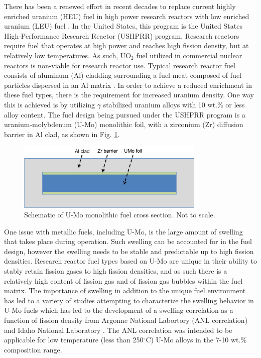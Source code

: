 \documentclass[review]{elsarticle}
\begin{document}
There has been a renewed effort in recent decades to replace current highly enriched uranium (HEU) fuel in high power research reactors with low enriched uranium (LEU) fuel \cite{snelgrove1997}. In the United States, this program is the United States High-Performance Research Reactor (USHPRR) program. Research reactors require fuel that operates at high power and reaches high fission density, but at relatively low temperatures. As such, UO$_{2}$ fuel utilized in commercial nuclear reactors is non-viable for research reactor use. Typical research reactor fuel consists of aluminum (Al) cladding surrounding a fuel meat composed of fuel particles dispersed in an Al matrix \cite{meyer2014}. In order to achieve a reduced enrichment in these fuel types, there is the requirement for increased uranium density. One way this is achieved is by utilizing $\gamma$ stabilized uranium alloys with 10 wt.\% or less alloy content. The fuel design being pursued under the USHPRR program is a uranium-molybdenum (U-Mo) monolithic foil, with a zirconium (Zr) diffusion barrier in Al clad, as shown in Fig. \ref{fig:ben1}. 

\begin{figure}[!h]
 \centering
 \includegraphics[width=0.8\textwidth]{ben1.png} 
 \caption{Schematic of U-Mo monolithic fuel cross section. Not to scale.}
 \label{fig:ben1}
\end{figure}

\FloatBarrier

One issue with metallic fuels, including U-Mo, is the large amount of swelling that takes place during operation\cite{hofman1997}. Such swelling can be accounted for in the fuel design, however the swelling needs to be stable and predictable up to high fission densities. Research reactor fuel types based on U-Mo are unique in their ability to stably retain fission gases to high fission densities, and as such there is a relatively high content of fission gas and of fission gas bubbles within the fuel matrix. The importance of swelling in addition to the unique fuel environment has led to a variety of studies attempting to characterize the swelling behavior in U-Mo fuels \cite{rest2009, kim_anl08, meyer2002, kim2013} which has led to the development of a swelling correlation as a function of fission density from Argonne National Labortory (ANL correlation) \cite{kim2011} and Idaho National Laboratory \cite{umo_prelim_report2017}. The ANL correlation was intended to be applicable for low temperature (less than 250$^{\circ}$C) U-Mo alloys in the 7-10 wt.\% composition range. 
\end{document}
